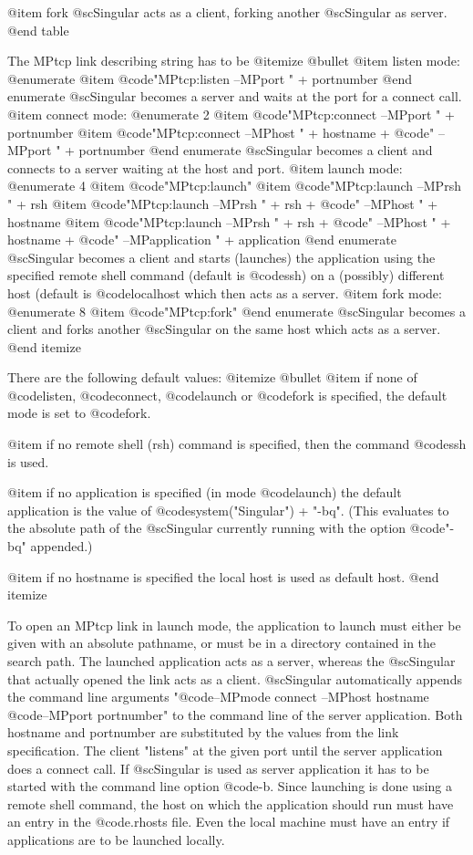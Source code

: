 {{{{{{@item fork
@sc{Singular} acts as a client, forking another @sc{Singular} as
server.
@end table

The MPtcp link describing string has to be
@itemize @bullet
@item listen mode:
@enumerate
@item @code{"MPtcp:listen --MPport "} + portnumber
@end enumerate
@sc{Singular} becomes a server and waits at the port for a
connect call.
@item connect mode:
@enumerate 2
@item @code{"MPtcp:connect --MPport "} + portnumber
@item @code{"MPtcp:connect --MPhost "} + hostname + @code{" --MPport "} +
portnumber
@end enumerate
@sc{Singular} becomes a client and connects to a server waiting at
the host and port.
@item launch mode:
@enumerate 4
@item @code{"MPtcp:launch"}
@item @code{"MPtcp:launch --MPrsh "} + rsh
@item @code{"MPtcp:launch --MPrsh "} + rsh  + @code{" --MPhost "} +
hostname
@item @code{"MPtcp:launch --MPrsh "} + rsh  + @code{" --MPhost "} +
hostname + @code{" --MPapplication "} + application
@end enumerate
@sc{Singular} becomes a client and starts (launches) the application
using the specified remote shell command (default is
@code{ssh}) on a (possibly) different host (default is @code{localhost}
which then acts as a server.
@item fork mode:
@enumerate 8
@item @code{"MPtcp:fork"}
@end enumerate
@sc{Singular} becomes a client and forks another @sc{Singular} on the
same host which acts as a server.
@end itemize

There are the following default values:
@itemize @bullet
@item if none of @code{listen}, @code{connect}, @code{launch} or
@code{fork} is specified, the default mode is set to @code{fork}.

@item if no remote shell (rsh) command is specified, then the command
@code{ssh} is used.

@item if no application is specified (in mode @code{launch}) the default
application is the value of @code{system("Singular") + "-bq"}.
(This evaluates to the absolute path of the @sc{Singular} currently running
with the option @code{"-bq"} appended.)

@item if no hostname is specified the local host is used as default host.
@end itemize

To open an MPtcp link in launch mode, the application to launch must
either be given with an absolute pathname, or must be in a directory
contained in the search path. The launched application acts as a server,
whereas the @sc{Singular} that actually opened the link acts as a
client. @sc{Singular} automatically appends the command line arguments
"@code{--MPmode connect --MPhost} hostname @code{--MPport} portnumber"
to the command line of the server application. Both hostname and
portnumber are substituted by the values from the link
specification. The client "listens" at the given port until the server
application does a connect call. If @sc{Singular} is used as server
application it has to be started with the command line option @code{-b}.
Since launching is done using a remote shell command, the host on which
the application should run must have an entry in the @code{.rhosts}
file. Even the local machine must have an entry if applications are to
be launched locally.

}}}}}}
